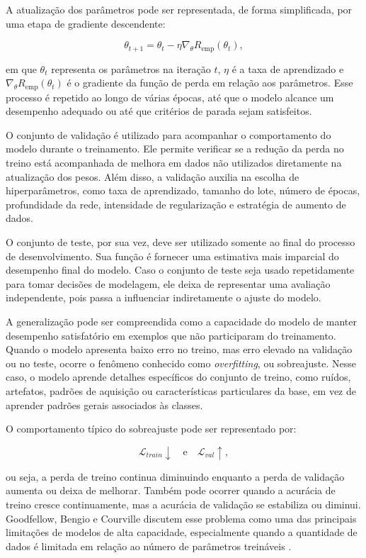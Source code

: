 \documentclass[
    12pt,
    openright,
    oneside,
    a4paper,
    english,
    brazil
]{abntex2}
\begin{document}
A atualização dos parâmetros pode ser representada, de forma simplificada, por uma etapa de gradiente descendente:

\[
\theta_{t+1}
=
\theta_t
-
\eta
\nabla_{\theta}
R_{\text{emp}}(\theta_t),
\]

em que \(\theta_t\) representa os parâmetros na iteração \(t\), \(\eta\) é a taxa de aprendizado e \(\nabla_{\theta}R_{\text{emp}}(\theta_t)\) é o gradiente da função de perda em relação aos parâmetros. Esse processo é repetido ao longo de várias épocas, até que o modelo alcance um desempenho adequado ou até que critérios de parada sejam satisfeitos.

O conjunto de validação é utilizado para acompanhar o comportamento do modelo durante o treinamento. Ele permite verificar se a redução da perda no treino está acompanhada de melhora em dados não utilizados diretamente na atualização dos pesos. Além disso, a validação auxilia na escolha de hiperparâmetros, como taxa de aprendizado, tamanho do lote, número de épocas, profundidade da rede, intensidade de regularização e estratégia de aumento de dados.

O conjunto de teste, por sua vez, deve ser utilizado somente ao final do processo de desenvolvimento. Sua função é fornecer uma estimativa mais imparcial do desempenho final do modelo. Caso o conjunto de teste seja usado repetidamente para tomar decisões de modelagem, ele deixa de representar uma avaliação independente, pois passa a influenciar indiretamente o ajuste do modelo.

A generalização pode ser compreendida como a capacidade do modelo de manter desempenho satisfatório em exemplos que não participaram do treinamento. Quando o modelo apresenta baixo erro no treino, mas erro elevado na validação ou no teste, ocorre o fenômeno conhecido como \textit{overfitting}, ou sobreajuste. Nesse caso, o modelo aprende detalhes específicos do conjunto de treino, como ruídos, artefatos, padrões de aquisição ou características particulares da base, em vez de aprender padrões gerais associados às classes.

O comportamento típico do sobreajuste pode ser representado por:

\[
\mathcal{L}_{train} \downarrow
\quad \text{e} \quad
\mathcal{L}_{val} \uparrow,
\]

ou seja, a perda de treino continua diminuindo enquanto a perda de validação aumenta ou deixa de melhorar. Também pode ocorrer quando a acurácia de treino cresce continuamente, mas a acurácia de validação se estabiliza ou diminui. Goodfellow, Bengio e Courville discutem esse problema como uma das principais limitações de modelos de alta capacidade, especialmente quando a quantidade de dados é limitada em relação ao número de parâmetros treináveis \cite{goodfellow2016deep}.
\end{document}
